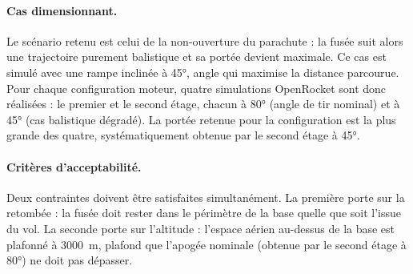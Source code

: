 \vfill

\paragraph*{Cas dimensionnant.} Le scénario retenu est celui de la non-ouverture du parachute : la fusée suit alors une trajectoire
purement balistique et sa portée devient maximale. Ce cas est simulé avec une rampe inclinée à 45°, angle qui maximise la distance
parcourue. Pour chaque configuration moteur, quatre simulations \gls{OpenRocket} sont donc réalisées : le premier et le second
étage, chacun à 80° (angle de tir nominal) et à 45° (cas balistique dégradé). La portée retenue pour la configuration est la plus
grande des quatre, systématiquement obtenue par le second étage à 45°.

\vfill

\paragraph*{Critères d'acceptabilité.} Deux contraintes doivent être satisfaites simultanément. La première porte sur la retombée :
la fusée doit rester dans le périmètre de la base quelle que soit l'issue du vol. La seconde porte sur l'altitude : l'espace
aérien au-dessus de la base est plafonné à 3000~m, plafond que l'apogée nominale (obtenue par le second étage à 80°) ne doit pas
dépasser.\\

\vfill

